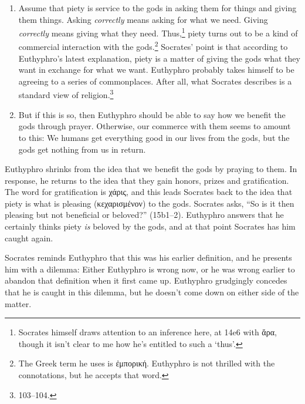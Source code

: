 \documentclass[11pt]{article}
\begin{document}
\begin{enumerate}

    \item Assume that piety is service to the gods in asking them for things and giving them things.  Asking \emph{correctly} means asking for what we need.  Giving \emph{correctly} means giving what they need.  Thus,\footnote{Socrates himself draws attention to an inference here, at 14e6 with {\g ἄρα}, though it isn't clear to me how he's entitled to such a `thus'.} piety turns out to be a kind of commercial interaction with the gods.\footnote{The Greek term he uses is {\g ἐμπορική}.  Euthyphro is not thrilled with the connotations, but he accepts that word.}  Socrates' point is that according to Euthyphro's latest explanation, piety is a matter of giving the gods what they want in exchange for what we want.  Euthyphro probably takes himself to be agreeing to a series of commonplaces.  After all, what Socrates describes is a standard  view of religion.\footnote{\citet{bailly2003} 103--104.}

    \item But if this is so, then Euthyphro should be able to say how we benefit the gods through prayer.  Otherwise, our commerce with them seems to amount to this: We humans get everything good in our lives from the gods, but the gods get nothing from us in return.

\end{enumerate}

Euthyphro shrinks from the idea that we benefit the gods by praying to them.  In response, he returns to the idea that they gain honors, prizes and gratification.  The word for gratification is {\g χάρις}, and this leads Socrates back to the idea that piety is what is pleasing ({\g κεχαρισμένον}) to the gods.  Socrates asks, ``So is it then pleasing but not beneficial or beloved?'' (15b1--2).  Euthyphro answers that he certainly thinks piety \emph{is} beloved by the gods, and at that point Socrates has him caught again.

Socrates reminds Euthyphro that this was his earlier definition, and he presents him with a dilemma: Either Euthyphro is wrong now, or he was wrong earlier to abandon that definition when it first came up.  Euthyphro grudgingly concedes that he is caught in this dilemma, but he doesn't come down on either side of the matter.



\end{document}
